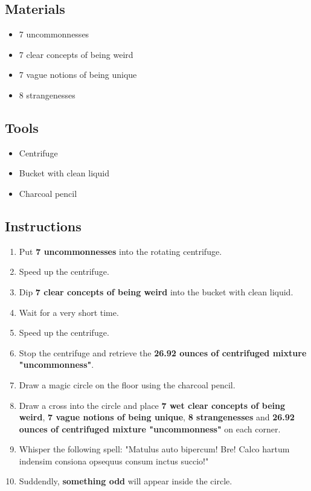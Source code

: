 \documentclass{article}
\begin{document}
\subsection{Materials}\begin{itemize}
\item 
7 uncommonnesses
\item 
7 clear concepts of being weird
\item 
7 vague notions of being unique
\item 
8 strangenesses
\end{itemize}
\subsection{Tools}\begin{itemize}
\item 
Centrifuge
\item 
Bucket with clean liquid
\item 
Charcoal pencil
\end{itemize}
\subsection{Instructions}\begin{enumerate}
\item 
Put \textbf{7 uncommonnesses} into the rotating centrifuge.
\item 
Speed up the centrifuge.
\item 
Dip \textbf{7 clear concepts of being weird} into the bucket with clean liquid.
\item 
Wait for a very short time.
\item 
Speed up the centrifuge.
\item 
Stop the centrifuge and retrieve the \textbf{26.92 ounces of centrifuged mixture "uncommonness"}.
\item 
Draw a magic circle on the floor using the charcoal pencil.
\item 
Draw a cross into the circle and place \textbf{7 wet clear concepts of being weird}, \textbf{7 vague notions of being unique}, \textbf{8 strangenesses} and \textbf{26.92 ounces of centrifuged mixture "uncommonness"} on each corner.
\item 
Whisper the following spell: "Matulus auto bipercum! Bre! Calco hartum indensim consiona opsequus consum inctus succio!"
\item 
Suddendly, \textbf{something odd} will appear inside the circle.
\end{enumerate}
\newpage
\end{document}
